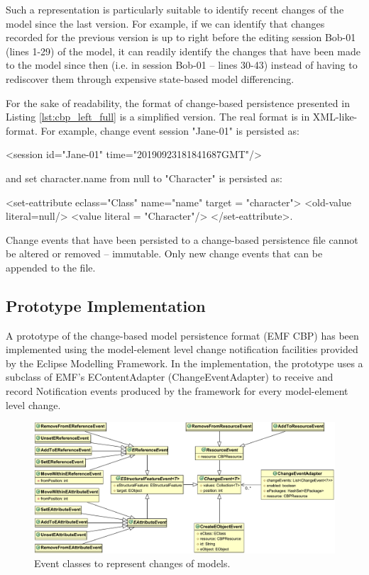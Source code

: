 Such a representation is particularly suitable to identify recent changes of the model since the last version. For example, if we can identify that changes recorded for the previous version is up to right before the editing session \textsf{Bob-01} (lines 1-29) of the model, it can readily identify the changes that have been made to the model since then (i.e. in session \textsf{Bob-01} -- lines 30-43) instead of having to rediscover them through expensive state-based model differencing.

For the sake of readability, the format of change-based persistence presented in Listing \ref{lst:cbp_left_full} is a simplified version. The real format is in XML-like-format. For example, change event \textsf{session "Jane-01"} is persisted as:

\textsf{<session id="Jane-01" time="20190923181841687GMT"/>} 

and \textsf{set character.name from null to "Character"} is persisted as:

\textsf{<set-eattribute eclass="Class" name="name" 
target = "character">
<old-value literal=null/>
<value literal = "Character"/>
</set-eattribute>}.

Change events that have been persisted to a change-based persistence file cannot be altered or removed -- immutable. Only new change events that can be appended to the file.

\subsection{Prototype Implementation}
\label{sec:prototype_implementation}

A prototype \cite{epsilonlabs2019emfcbp} of the change-based model persistence format (EMF CBP) has been implemented using the model-element level change notification facilities provided by the Eclipse Modelling Framework. In the implementation, the prototype uses a subclass of EMF's \textsf{EContentAdapter} (\textsf{ChangeEventAdapter}) to receive and record \textsf{Notification} events produced by the framework for every model-element level change.

\begin{figure}[th]
  \centering
  \includegraphics[width=\linewidth]{events}
  \caption{Event classes to represent changes of models.}
  \label{fig:events}
\end{figure}

